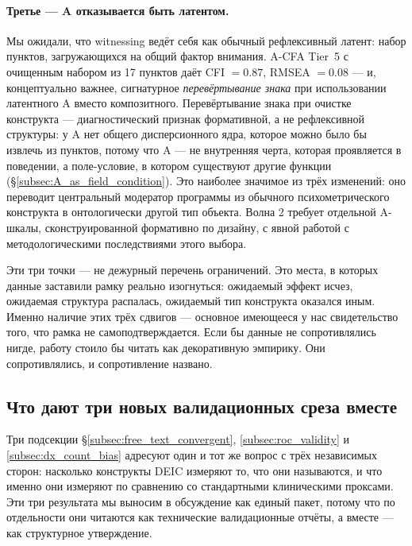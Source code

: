\paragraph{Третье --- A отказывается быть латентом.} Мы ожидали, что witnessing ведёт себя как обычный рефлексивный латент: набор пунктов, загружающихся на общий фактор внимания. A-CFA Tier~5 с очищенным набором из 17 пунктов даёт CFI $= 0.87$, RMSEA $= 0.08$ --- и, концептуально важнее, сигнатурное \emph{перевёртывание знака} \IMM{} при использовании латентного A вместо композитного. Перевёртывание знака при очистке конструкта --- диагностический признак формативной, а не рефлексивной структуры: у A нет общего дисперсионного ядра, которое можно было бы извлечь из пунктов, потому что A --- не внутренняя черта, которая проявляется в поведении, а поле-условие, в котором существуют другие функции (§\ref{subsec:A_as_field_condition}). Это наиболее значимое из трёх изменений: оно переводит центральный модератор программы из обычного психометрического конструкта в онтологически другой тип объекта. Волна 2 требует отдельной A-шкалы, сконструированной формативно по дизайну, с явной работой с методологическими последствиями этого выбора.

Эти три точки --- не дежурный перечень ограничений. Это места, в которых данные заставили рамку реально изогнуться: ожидаемый эффект исчез, ожидаемая структура распалась, ожидаемый тип конструкта оказался иным. Именно наличие этих трёх сдвигов --- основное имеющееся у нас свидетельство того, что рамка не самоподтверждается. Если бы данные не сопротивлялись нигде, работу стоило бы читать как декоративную эмпирику. Они сопротивлялись, и сопротивление названо.

\subsection{Что дают три новых валидационных среза вместе}
\label{subsec:validity_package}

Три подсекции §\ref{subsec:free_text_convergent}, \ref{subsec:roc_validity} и \ref{subsec:dx_count_bias} адресуют один и тот же вопрос с трёх независимых сторон: насколько конструкты DEIC измеряют то, что они называются, и что именно они измеряют по сравнению со стандартными клиническими проксами. Эти три результата мы выносим в обсуждение как единый пакет, потому что по отдельности они читаются как технические валидационные отчёты, а вместе --- как структурное утверждение.

